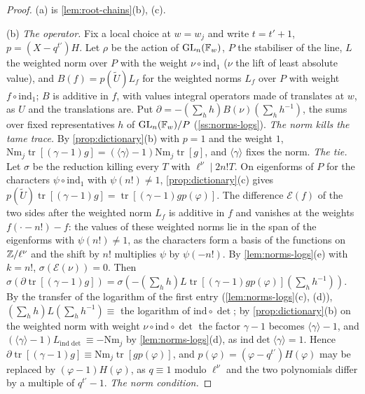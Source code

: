 \begin{proof}
(a) is \cref{lem:root-chains}(b), (c).

(b) \emph{The operator.} Fix a local choice at $w=w_j$ and write $t=t'+1$, $p=(X-q^{t'})H$. Let $\rho$ be the action of $\operatorname{GL}_n(\mathbb{F}_w)$, $P$ the stabiliser of the line, $L$ the weighted norm over $P$ with the weight $\nu\circ\mathrm{ind}_1$ ($\nu$ the lift of
least absolute value), and $B(f)=p(\tilde U)L_f$ for the weighted norms $L_f$ over $P$ with weight $f\circ\mathrm{ind}_1$; $B$ is additive in $f$, with values integral operators made of translates at $w$, as $U$ and the translations are. Put
$\partial=-(\sum_hh)B(\nu)(\sum_hh^{-1})$, the sums over fixed representatives $h$ of $\operatorname{GL}_n(\mathbb{F}_w)/P$ (\cref{ss:norms-logs}). \emph{The norm kills the tame trace.} By \cref{prop:dictionary}(b) with $p=1$ and the weight $1$, $\mathrm{Nm}_j\operatorname{tr}[(\gamma-1)g]=(\langle\gamma\rangle-1)\mathrm{Nm}_j\operatorname{tr}[g]$,
and $\langle\gamma\rangle$ fixes the norm. \emph{The tie.} Let $\sigma$ be the reduction killing every $T$ with $\ell^\nu\mid2n!T$. On eigenforms of $P$ for the characters $\psi\circ\mathrm{ind}_1$ with $\psi(n!)\ne1$, \cref{prop:dictionary}(c) gives
$p(\tilde U)\operatorname{tr}[(\gamma-1)g]=\operatorname{tr}[(\gamma-1)gp(\varphi)]$. The difference $\mathcal E(f)$ of the two sides after the weighted norm $L_f$ is additive in $f$ and vanishes at the weights $f(\cdot-n!)-f$: the values of these weighted norms lie in the
span of the eigenforms with $\psi(n!)\ne1$, as the characters form a basis of the functions on $\mathbb{Z}/\ell^\nu$ and the shift by $n!$ multiplies $\psi$ by $\psi(-n!)$. By \cref{lem:norms-logs}(e) with $k=n!$, $\sigma(\mathcal E(\nu))=0$. Then
$\sigma(\partial\operatorname{tr}[(\gamma-1)g])=\sigma(-(\sum_hh)L\operatorname{tr}[(\gamma-1)gp(\varphi)](\sum_hh^{-1}))$. By the transfer of the logarithm of the first entry (\cref{lem:norms-logs}(c), (d)), $(\sum_hh)L(\sum_hh^{-1})\equiv$ the logarithm of $\mathrm{ind}\circ\det$; by
\cref{prop:dictionary}(b) on the weighted norm with weight $\nu\circ\mathrm{ind}\circ\det$ the factor $\gamma-1$ becomes $\langle\gamma\rangle-1$, and $(\langle\gamma\rangle-1)L_{\mathrm{ind}\det}\equiv-\mathrm{Nm}_j$ by \cref{lem:norms-logs}(d), as $\mathrm{ind}\det\langle\gamma\rangle=1$. Hence
$\partial\operatorname{tr}[(\gamma-1)g]\equiv\mathrm{Nm}_j\operatorname{tr}[gp(\varphi)]$, and $p(\varphi)=(\varphi-q^{t'})H(\varphi)$ may be replaced by $(\varphi-1)H(\varphi)$, as $q\equiv1$ modulo $\ell^\nu$ and the two polynomials differ by a multiple of $q^{t'}-1$. \emph{The norm condition.}

\end{proof}
